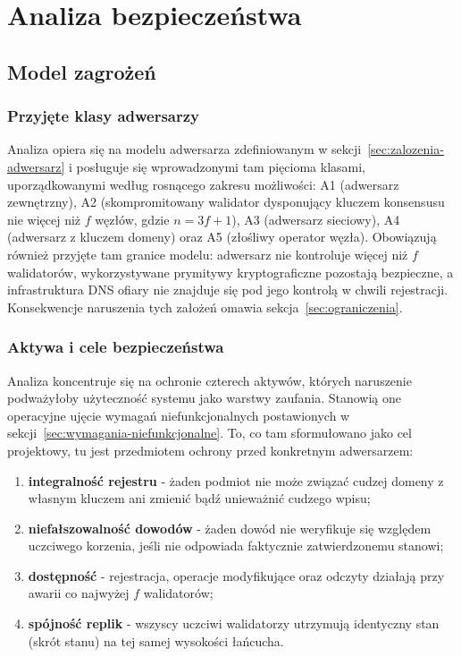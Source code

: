 \chapter{Analiza bezpieczeństwa}
\label{ch:analiza-bezpieczenstwa}

\section{Model zagrożeń}
\label{sec:model-zagrozen}

\subsection{Przyjęte klasy adwersarzy}
\label{subsec:aktorzy}

Analiza opiera się na modelu adwersarza zdefiniowanym w sekcji~\ref{sec:zalozenia-adwersarz} i posługuje się wprowadzonymi tam pięcioma klasami, uporządkowanymi według rosnącego zakresu możliwości: A1 (adwersarz zewnętrzny), A2 (skompromitowany walidator dysponujący kluczem konsensusu nie więcej niż $f$ węzłów, gdzie $n = 3f + 1$), A3 (adwersarz sieciowy), A4 (adwersarz z kluczem domeny) oraz A5 (złośliwy operator węzła). Obowiązują również przyjęte tam granice modelu: adwersarz nie kontroluje więcej niż $f$ walidatorów, wykorzystywane prymitywy kryptograficzne pozostają bezpieczne, a infrastruktura DNS ofiary nie znajduje się pod jego kontrolą w chwili rejestracji. Konsekwencje naruszenia tych założeń omawia sekcja~\ref{sec:ograniczenia}.

\subsection{Aktywa i cele bezpieczeństwa}
\label{subsec:aktywa}

Analiza koncentruje się na ochronie czterech aktywów, których naruszenie podważyłoby użyteczność systemu jako warstwy zaufania. Stanowią one operacyjne ujęcie wymagań niefunkcjonalnych postawionych w sekcji~\ref{sec:wymagania-niefunkcjonalne}. To, co tam sformułowano jako cel projektowy, tu jest przedmiotem ochrony przed konkretnym adwersarzem:
\begin{enumerate}
    \item \textbf{integralność rejestru} - żaden podmiot nie może związać cudzej domeny z własnym kluczem ani zmienić bądź unieważnić cudzego wpisu;
    \item \textbf{niefałszowalność dowodów} - żaden dowód nie weryfikuje się względem uczciwego korzenia, jeśli nie odpowiada faktycznie zatwierdzonemu stanowi;
    \item \textbf{dostępność} - rejestracja, operacje modyfikujące oraz odczyty działają przy awarii co najwyżej $f$ walidatorów;
    \item \textbf{spójność replik} - wszyscy uczciwi walidatorzy utrzymują identyczny stan (skrót stanu) na tej samej wysokości łańcucha.
\end{enumerate}

